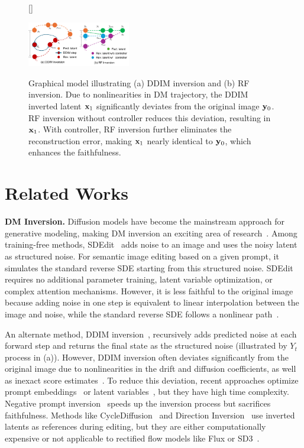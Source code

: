 \documentclass{article} %
\theoremstyle{plain}
\begin{document}
\begin{figure}
[\FBwidth]
{\caption{
Graphical model illustrating (a) DDIM inversion and (b) RF inversion. 
Due to nonlinearities in DM trajectory, the DDIM inverted latent {\color{red}${\mathbf{x}}_1$} significantly deviates from the original image {\color{orange} ${\mathbf{y}}_0$}. 
RF inversion without controller reduces this deviation, resulting in {\color{purple}${\mathbf{x}}_1$}.
With controller, RF inversion further eliminates the reconstruction error, making {\color{cyan}${\mathbf{x}}_1$} nearly identical to {\color{orange} ${\mathbf{y}}_0$}, which enhances the faithfulness.
}
\label{fig:graph}}
{\includegraphics[width=0.4\textwidth]{pics/graph-v2.pdf}}
\vspace{-3ex}
\end{figure}



\vspace{-2.5ex}
\section{Related Works}
\label{sec:rel-work}
\vspace{-1.5ex}
\noindent\textbf{DM Inversion.} Diffusion models have become the mainstream approach for generative modeling, making DM inversion an exciting area of research~\citep{sdedit,diffedit,songscore,stylealigned,nti,stsl}. Among training-free methods, SDEdit~\citep{sdedit} adds noise to an image and uses the noisy latent as structured noise. For semantic image editing based on a given prompt, it simulates the standard reverse SDE starting from this structured noise. SDEdit requires no additional parameter training, latent variable optimization, or complex attention mechanisms. However, it is less faithful to the original image because adding noise in one step is equivalent to linear interpolation between the image and noise, while the standard reverse SDE follows a nonlinear path~\citep{rectflow,edm}.

An alternate method, DDIM inversion~\citep{ddim,songscore}, recursively adds predicted noise at each forward step and returns the final state as the structured noise (illustrated by $Y_t$ process in (a)). 
However, DDIM inversion often deviates significantly from the original image due to nonlinearities in the drift and diffusion coefficients, as well as inexact score estimates~\citep{nti}.
To reduce this deviation, recent approaches optimize prompt embeddings~\citep{nti} or latent variables~\citep{stsl}, but they have high time complexity.
Negative prompt inversion~\citep{negprompt} speeds up the inversion process but sacrifices faithfulness. 
Methods like CycleDiffusion~\citep{cyclediffusion} and Direction Inversion~\citep{ju2023humansd} use inverted latents as references during editing, but they are either computationally expensive or not applicable to rectified flow models like Flux or SD3~\citep{sd3}.
\end{document}
